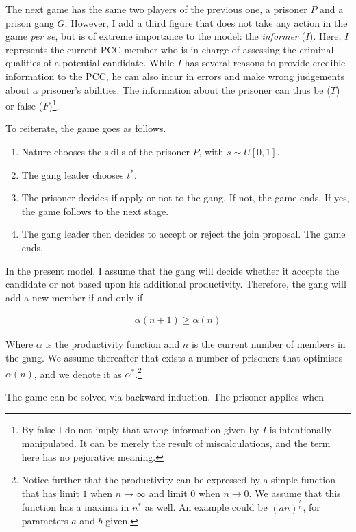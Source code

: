 The next game has the same two players of the previous one, a prisoner $P$ and a prison gang $G$. However, I add a third figure that does not take any action in the game \textit{per se}, but is of extreme importance to the model: the \textit{informer} ($I$). Here, $I$ represents the current PCC member who is in charge of assessing the criminal qualities of a potential candidate. While $I$ has several reasons to provide credible information to the PCC, he can also incur in errors and make wrong judgements about a prisoner's abilities. The information about the prisoner can thus be ($T$) or false ($F$)\footnote{By false I do not imply that wrong information given by $I$ is intentionally manipulated. It can be merely the result of miscalculations, and the term here has no pejorative meaning.}.

To reiterate, the game goes as follows.

\begin{enumerate}
\item Nature chooses the skills of the prisoner $P$, with $s \sim U[0,1]$.
\item The gang leader chooses $t^*$.
\item The prisoner decides if apply or not to the gang. If not, the game ends. If yes, the game follows to the next stage.
\item The gang leader then decides to accept or reject the join proposal. The game ends.
\end{enumerate}

In the present model, I assume that the gang will decide whether it accepts the candidate or not based upon his additional productivity. Therefore, the gang will add a new member if and only if

\begin{align}
\alpha \left( n + 1 \right) \geq \alpha \left(n\right)
\end{align}

Where $\alpha$ is the productivity function and $n$ is the current number of members in the gang. We assume thereafter that exists a number of prisoners that optimises $\alpha(n)$, and we denote it as $\alpha^*$.\footnote{Notice further that the productivity can be expressed by a simple function that has limit $1$ when $n \rightarrow \infty$ and limit $0$ when $n \rightarrow 0$. We assume that this function has a maxima in $n^*$ as well. An example could be $(an)^\frac{b}{n}$, for parameters $a$ and $b$ given.}

The game can be solved via backward induction. The prisoner applies when

